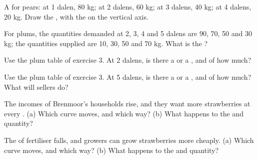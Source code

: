 \begin{exercise}[$\star$]\label{exo:g7:demand-and-supply-first-look:2}
A  for pears: at 1 dalen, 80 kg; at 2 dalens, 60 kg; at 3 dalens, 40 kg; at 4
dalens, 20 kg. Draw the , with the  on the vertical axis.
\end{exercise}

\begin{exercise}[$\star$]\label{exo:g7:demand-and-supply-first-look:3}
For plums, the quantities demanded at 2, 3, 4 and 5 dalens are 90, 70, 50 and 30 kg; the
quantities supplied are 10, 30, 50 and 70 kg. What is the ?
\end{exercise}

\begin{exercise}[$\star$]\label{exo:g7:demand-and-supply-first-look:4}
Use the plum table of exercise 3. At 2 dalens, is there a  or a , and of
how much?
\end{exercise}

\begin{exercise}[$\star\star$]\label{exo:g7:demand-and-supply-first-look:5}
Use the plum table of exercise 3. At 5 dalens, is there a  or a , and of
how much? What will sellers do?
\end{exercise}

\begin{exercise}[$\star\star$]\label{exo:g7:demand-and-supply-first-look:6}
The incomes of Brenmoor's households rise, and they want more strawberries at every .
(a) Which curve moves, and which way? (b) What happens to the  and quantity?
\end{exercise}

\begin{exercise}[$\star\star$]\label{exo:g7:demand-and-supply-first-look:7}
The  of fertiliser falls, and growers can grow strawberries more cheaply. (a) Which
curve moves, and which way? (b) What happens to the  and quantity?
\end{exercise}

